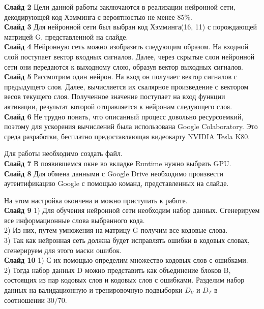\documentclass[a4paper]{article}
\begin{document}
\textbf{Слайд 2}
Цели данной работы заключаются в реализации нейронной сети, декодирующей код Хэмминга с вероятностью не менее 85\%. \\

\textbf{Слайд 3}
Для нейронной сети был выбран код Хэмминга(16, 11) с порождающей матрицей G, представленной на слайде.\\

\textbf{Слайд 4}
Нейронную сеть можно изобразить следующим образом. На входной слой поступает вектор входных сигналов. Далее, через скрытые слои нейронной сети они передаются к выходному слою, образуя вектор выходных сигналов.\\

\textbf{Слайд 5}
Рассмотрим один нейрон. На вход он получает вектор сигналов с предыдущего слоя. Далее, вычисляется их скалярное произведение с вектором весов текущего слоя. Полученное значение поступает на вход функции активации, результат которой отправляется к нейронам следующего слоя. \\

\textbf{Слайд 6}
Не трудно понять, что описанный процесс довольно ресурсоемкий, поэтому для ускорения вычислений была использована Google Colaboratory. Это среда разработки, бесплатно предоставляющая видеокарту NVIDIA Tesla K80.

Для работы необходимо создать файл.\\

\textbf{Слайд 7}
В появившемся окне во вкладке Runtime нужно выбрать GPU. \\

\textbf{Слайд 8}
Для обмена данными с Google Drive необходимо произвести аутентификацию Google с помощью команд, представленных на слайде.

На этом настройка окончена и можно приступать к работе.\\

\textbf{Слайд 9}
1) Для обучения нейронной сети необходим набор данных. Сгенерируем все информационные слова выбранного кода.\\
2) Из них, путем умножения на матрицу G получим все кодовые слова.\\
3) Так как нейронная сеть должна будет исправлять ошибки в кодовых словах, сгенерируем для этого маски ошибок.\\

\textbf{Слайд 10}
1) С их помощью определим множество кодовых слов с ошибками. \\
2) Тогда набор данных D можно представить как объединение блоков B, состоящих из пар кодовых слов и кодовых слов с ошибками. Разделим набор данных на валидационную и тренировочную подвыборки $D_V$ и $D_T$ в соотношении $30/70$.\\
\end{document}
